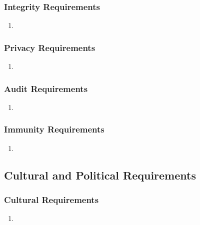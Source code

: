 \documentclass[]{article}
\begin{document}
\subsubsection{Integrity Requirements}
\label{ssub:integrity_requirements}
\begin{enumerate}[{SR}1. ]
	\item 
\end{enumerate}

\subsubsection{Privacy Requirements}
\label{ssub:privacy_requirements}
\begin{enumerate}[{SR}1. ]
	\item 
\end{enumerate}

\subsubsection{Audit Requirements}
\label{ssub:audit_requirements}
\begin{enumerate}[{SR}1. ]
	\item 
\end{enumerate}

\subsubsection{Immunity Requirements}
\label{ssub:immunity_requirements}
\begin{enumerate}[{SR}1. ]
	\item 
\end{enumerate}


\subsection{Cultural and Political Requirements}
\label{sub:cultural_and_political_requirements}

\subsubsection{Cultural Requirements}
\label{ssub:cultural_requirements}
\begin{enumerate}[{CP}1. ]
	\item 
\end{enumerate}
\end{document}
